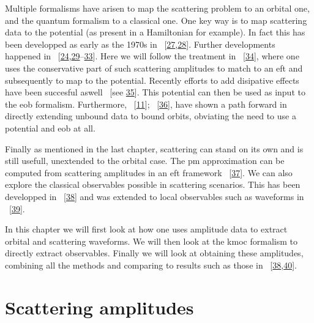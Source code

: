 \documentclass[
  10pt,
  a4paper,
  DIV=11,
  numbers=noendperiod,
  oneside]{scrreprt}
\DeclareRobustCommand{\[}{\begin{equation}}
\DeclareRobustCommand{\]}{\end{equation}}
\begin{document}
Multiple formalisms have arisen to map the scattering problem to an
orbital one, and the quantum formalism to a classical one. One key way
is to map scattering data to the potential (as present in a Hamiltonian
for example). In fact this has been developped as early as the 1970s in
~{[}\protect\hyperlink{ref-Hiida:1972xs}{27},\protect\hyperlink{ref-Iwasaki:1971vb}{28}{]}.
Further developments happened in
~{[}\protect\hyperlink{ref-Damour:2016gwp}{24},\protect\hyperlink{ref-Neill:2013wsa}{29}--\protect\hyperlink{ref-Guevara:2017csg}{33}{]}.
Here we will follow the treatment in
~{[}\protect\hyperlink{ref-Cheung:2018wkq}{34}{]}, where one uses the
conservative part of such scattering amplitudes to match to an \gls{eft}
and subsequently to map to the potential. Recently efforts to add
disipative effects have been succesful aswell ~{[}see
\protect\hyperlink{ref-Kalin:2022hph}{35}{]}. This potential can then be
used as input to the \gls{eob} formalism. Furthermore,
~{[}\protect\hyperlink{ref-Kalin:2019rwq}{11}{]};
~{[}\protect\hyperlink{ref-Kalin:2019inp}{36}{]}, have shown a path
forward in directly extending unbound data to bound orbits, obviating
the need to use a potential and \gls{eob} at all.

Finally as mentioned in the last chapter, scattering can stand on its
own and is still usefull, unextended to the orbital case. The \gls{pm}
approximation can be computed from scattering amplitudes in an \gls{eft}
framework ~{[}\protect\hyperlink{ref-Kalin:2020mvi}{37}{]}. We can also
explore the classical observables possible in scattering scenarios. This
has been developped in
~{[}\protect\hyperlink{ref-Kosower:2018adc}{38}{]} and was extended to
local observables such as waveforms in
~{[}\protect\hyperlink{ref-Cristofoli:2021vyo}{39}{]}.

In this chapter we will first look at how one uses amplitude data to
extract orbital and scattering waveforms. We will then look at the
\gls{kmoc} formalism to directly extract observables. Finally we will
look at obtaining these amplitudes, combining all the methods and
comparing to results such as those in
~{[}\protect\hyperlink{ref-Kosower:2018adc}{38},\protect\hyperlink{ref-Bern:2021xze}{40}{]}.

\hypertarget{sec-scatamp}{%
\section{Scattering amplitudes}\label{sec-scatamp}}
\end{document}
